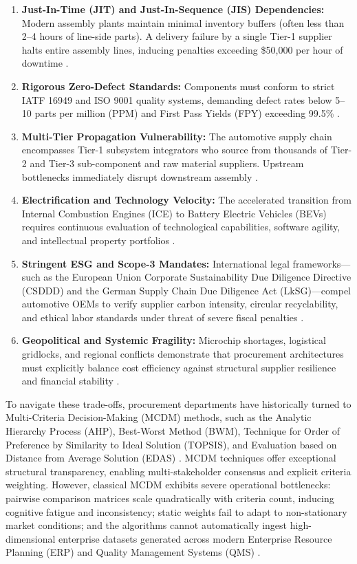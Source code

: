 \documentclass[twocolumn,10pt]{article}
\begin{document}
\begin{enumerate}
    \item \textbf{Just-In-Time (JIT) and Just-In-Sequence (JIS) Dependencies:} Modern assembly plants maintain minimal inventory buffers (often less than 2--4 hours of line-side parts). A delivery failure by a single Tier-1 supplier halts entire assembly lines, inducing penalties exceeding \$50,000 per hour of downtime \cite{kumar2022resilient}.
    \item \textbf{Rigorous Zero-Defect Standards:} Components must conform to strict IATF 16949 and ISO 9001 quality systems, demanding defect rates below 5--10 parts per million (PPM) and First Pass Yields (FPY) exceeding 99.5\% \cite{stecke2021supply}.
    \item \textbf{Multi-Tier Propagation Vulnerability:} The automotive supply chain encompasses Tier-1 subsystem integrators who source from thousands of Tier-2 and Tier-3 sub-component and raw material suppliers. Upstream bottlenecks immediately disrupt downstream assembly \cite{ivanov2020predicting}.
    \item \textbf{Electrification and Technology Velocity:} The accelerated transition from Internal Combustion Engines (ICE) to Battery Electric Vehicles (BEVs) requires continuous evaluation of technological capabilities, software agility, and intellectual property portfolios \cite{fallahpour2021hyper}.
    \item \textbf{Stringent ESG and Scope-3 Mandates:} International legal frameworks—such as the European Union Corporate Sustainability Due Diligence Directive (CSDDD) and the German Supply Chain Due Diligence Act (LkSG)—compel automotive OEMs to verify supplier carbon intensity, circular recyclability, and ethical labor standards under threat of severe fiscal penalties \cite{bai2022blockchain}.
    \item \textbf{Geopolitical and Systemic Fragility:} Microchip shortages, logistical gridlocks, and regional conflicts demonstrate that procurement architectures must explicitly balance cost efficiency against structural supplier resilience and financial stability \cite{choi2021risk}.
\end{enumerate}

To navigate these trade-offs, procurement departments have historically turned to Multi-Criteria Decision-Making (MCDM) methods, such as the Analytic Hierarchy Process (AHP), Best-Worst Method (BWM), Technique for Order of Preference by Similarity to Ideal Solution (TOPSIS), and Evaluation based on Distance from Average Solution (EDAS) \cite{rezaei2015best, ghorabaee2015evaluation}. MCDM techniques offer exceptional structural transparency, enabling multi-stakeholder consensus and explicit criteria weighting. However, classical MCDM exhibits severe operational bottlenecks: pairwise comparison matrices scale quadratically with criteria count, inducing cognitive fatigue and inconsistency; static weights fail to adapt to non-stationary market conditions; and the algorithms cannot automatically ingest high-dimensional enterprise datasets generated across modern Enterprise Resource Planning (ERP) and Quality Management Systems (QMS) \cite{dos2022hybrid}.
\end{document}
